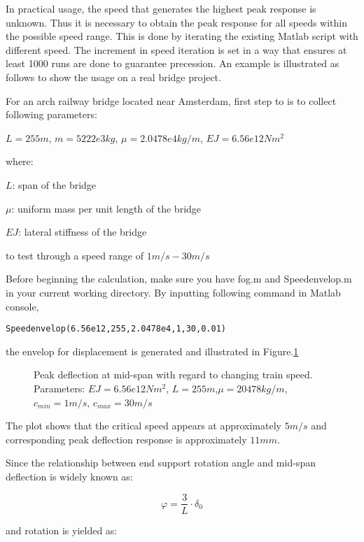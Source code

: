 In practical usage, the speed that generates the highest peak response is unknown. Thus it is necessary to obtain the peak response for all speeds within the possible speed range. This is done by iterating the existing Matlab script with different speed. The increment in speed iteration is set in a way that ensures at least 1000 runs are done to guarantee precession. An example is illustrated as follows to show the usage on a real bridge project.

For an arch railway bridge located near Amsterdam, first step to is to collect following parameters:

$L = 255m$, $m = 5222e3kg$, $\mu = 2.0478e4 kg/m$, $EJ = 6.56e12Nm^2$

where:

$L$: span of the bridge

$\mu$: uniform mass per unit length of the bridge

$EJ$: lateral stiffness of the bridge

to test through a speed range of $1m/s - 30m/s$

Before beginning the calculation, make sure you have fog.m and Speedenvelop.m in your current working directory. By inputting following command in Matlab console, 

\texttt{Speedenvelop(6.56e12,255,2.0478e4,1,30,0.01)}


the envelop for displacement is generated and illustrated in Figure.\ref{fig:spedefEJ6560000000000L255min1max30mu20478.tikz}

\begin{figure}[h!]
\centering 
\newlength\figureheight 
\newlength\figurewidth 
\setlength\figureheight{6cm} 
\setlength\figurewidth{6cm} 
 
\caption{Peak deflection at mid-span with regard to changing train speed. Parameters: $EJ = 6.56e12Nm^2$, $L= 255m$,$\mu = 20478 kg/m$, $c_{min}=1m/s$, $c_{max} = 30m/s$} 
\label{fig:spedefEJ6560000000000L255min1max30mu20478.tikz} 
\end{figure}

The plot shows that the critical speed appears at approximately $5m/s$ and corresponding peak deflection response is approximately $11mm$. 

Since the relationship between end support rotation angle and mid-span deflection is widely known as:

$$ \varphi = \frac{3}{L}\cdot \delta_0  $$

and rotation is yielded as:

